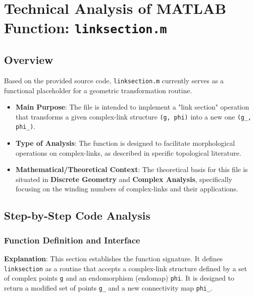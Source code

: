 

\chapter{Technical Analysis of MATLAB Function: \texttt{linksection.m}}
\author{}
\date{}


\maketitle

\section{Overview}

Based on the provided source code, \texttt{linksection.m} currently serves as a functional placeholder for a geometric transformation routine.

\begin{itemize}
    \item \textbf{Main Purpose}: The file is intended to implement a "link section" operation that transforms a given complex-link structure \texttt{(g, phi)} into a new one \texttt{(g\_, phi\_)}.
    \item \textbf{Type of Analysis}: The function is designed to facilitate morphological operations on complex-links, as described in specific topological literature.
    \item \textbf{Mathematical/Theoretical Context}: The theoretical basis for this file is situated in \textbf{Discrete Geometry} and \textbf{Complex Analysis}, specifically focusing on the winding numbers of complex-links and their applications.
\end{itemize}

\section{Step-by-Step Code Analysis}

\subsection{Function Definition and Interface}
\textbf{Explanation}: This section establishes the function signature. It defines 
\texttt{linksection} as a routine that accepts a complex-link structure defined by a set of complex points 
\texttt{g} and an endomorphism (endomap) 
\texttt{phi}. It is designed to return a modified set of points 
\texttt{g\_} and a new connectivity map 
\texttt{phi\_}.

